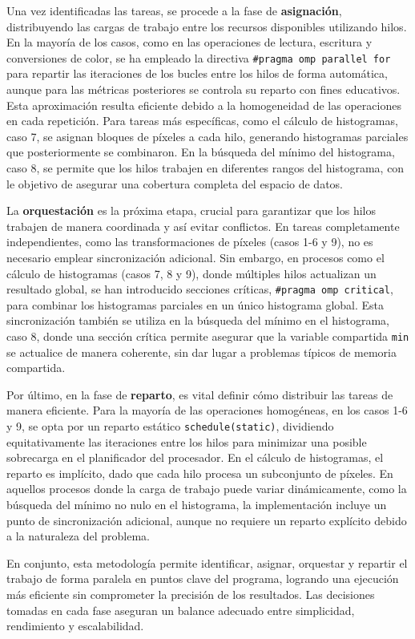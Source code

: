 Una vez identificadas las tareas, se procede a la fase de \textbf{asignación}, distribuyendo las cargas de trabajo entre los recursos disponibles utilizando hilos. En la mayoría de los casos, como en las operaciones de lectura, escritura y conversiones de color, se ha empleado la directiva \texttt{\#pragma omp parallel for} para repartir las iteraciones de los bucles entre los hilos de forma automática, aunque para las métricas posteriores se controla su reparto con fines educativos. Esta aproximación resulta eficiente debido a la homogeneidad de las operaciones en cada repetición. Para tareas más específicas, como el cálculo de histogramas, caso 7, se asignan bloques de píxeles a cada hilo, generando histogramas parciales que posteriormente se combinaron. En la búsqueda del mínimo del histograma, caso 8, se permite que los hilos trabajen en diferentes rangos del histograma, con le objetivo de asegurar una cobertura completa del espacio de datos.

La \textbf{orquestación} es la próxima etapa, crucial para garantizar que los hilos trabajen de manera coordinada y así evitar conflictos. En tareas completamente independientes, como las transformaciones de píxeles (casos 1-6 y 9), no es necesario emplear sincronización adicional. Sin embargo, en procesos como el cálculo de histogramas (casos 7, 8 y 9), donde múltiples hilos actualizan un resultado global, se han introducido secciones críticas, \texttt{\#pragma omp critical}, para combinar los histogramas parciales en un único histograma global. Esta sincronización también se utiliza en la búsqueda del mínimo en el histograma, caso 8, donde una sección crítica permite asegurar que la variable compartida \texttt{min} se actualice de manera coherente, sin dar lugar a problemas típicos de memoria compartida.

Por último, en la fase de \textbf{reparto}, es vital definir cómo distribuir las tareas de manera eficiente. Para la mayoría de las operaciones homogéneas, en los casos 1-6 y 9, se opta por un reparto estático \texttt{schedule(static)}, dividiendo equitativamente las iteraciones entre los hilos para minimizar una posible sobrecarga en el planificador del procesador. En el cálculo de histogramas, el reparto es implícito, dado que cada hilo procesa un subconjunto de píxeles. En aquellos procesos donde la carga de trabajo puede variar dinámicamente, como la búsqueda del mínimo no nulo en el histograma, la implementación incluye un punto de sincronización adicional, aunque no requiere un reparto explícito debido a la naturaleza del problema.

En conjunto, esta metodología permite identificar, asignar, orquestar y repartir el trabajo de forma paralela en puntos clave del programa, logrando una ejecución más eficiente sin comprometer la precisión de los resultados. Las decisiones tomadas en cada fase aseguran un balance adecuado entre simplicidad, rendimiento y escalabilidad.